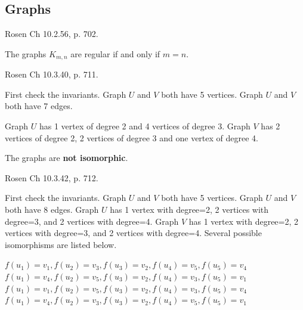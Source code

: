 \begin{questions}



\section*{Graphs}

 Rosen Ch 10.2.56, p. 702.
    \ifprintanswers
        \vspace{-12pt}
    \fi
    \begin{solution}
        The graphs $K_{m,n}$ are regular if and only if $m=n$.
    \end{solution}



 Rosen Ch 10.3.40, p. 711. 
    \ifprintanswers
        \vspace{-10pt}
    \fi
    \begin{solution}
    First check the invariants.  Graph $U$ and $V$ both have 5 vertices. Graph $U$ and $V$ both have 7 edges.

    Graph $U$ has 1 vertex of degree 2 and 4 vertices of degree 3.  Graph $V$ has 2 vertices of degree 2, 2 vertices of degree 3 and one vertex of degree 4. 

    The graphs are \textbf{not isomorphic}.
    \end{solution}



 Rosen Ch 10.3.42, p. 712.
    \ifprintanswers
        \vspace{-10pt}
    \fi
    \begin{solution}
    First check the invariants.  Graph $U$ and $V$ both have 5 vertices. Graph $U$ and $V$ both have 8 edges. Graph $U$ has 1 vertex with degree=2, 2 vertices with degree=3, and 2 vertices with degree=4.  Graph $V$ has 1 vertex with degree=2, 2 vertices with degree=3, and 2 vertices with degree=4.  Several possible  isomorphisms are listed below.
    
            $ f(u_1) = v_1, f(u_2) = v_3, f(u_3) = v_2, f(u_4) = v_5, f(u_5) = v_4 $\\
            $ f(u_1) = v_4, f(u_2) = v_5, f(u_3) = v_2, f(u_4) = v_3, f(u_5) = v_1 $ \\
            $ f(u_1) = v_1, f(u_2) = v_5, f(u_3) = v_2, f(u_4) = v_3, f(u_5) = v_4 $\\
            $ f(u_1) = v_4, f(u_2) = v_3, f(u_3) = v_2, f(u_4) = v_5, f(u_5) = v_1 $
    \end{solution}



\end{questions}
